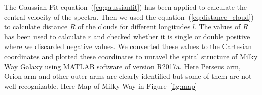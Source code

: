 \documentclass[conference]{IEEEtran}
\begin{document}
The Gaussian Fit equation~(\ref{eq:gaussianfit}) has been applied to calculate the central velocity of the spectra. Then we used the equation~(\ref{eq:distance_cloud}) to calculate distance $\mathit{R}$ of the clouds for different longitudes $\mathit{l}$. The values of $\mathit{R}$ has been used to calculate $\mathit{r}$ and checked whether it is single or double positive where we discarded negative values\cite{ThomasBensby2017,santo2013mapping}. We converted these values to the Cartesian coordinates and plotted these coordinates to unravel the spiral structure of Milky Way Galaxy using MATLAB software of version R2017a. Here Perseus arm, Orion arm and other outer arms are clearly identified but some of them are not well recognizable. Here Map of Milky Way in Figure~\ref{fig:map}

\begin{figure}[!t]
\centering
{}
\hfil
{}
\hfil
{}
\hfil
{}
\end{figure}
\end{document}
